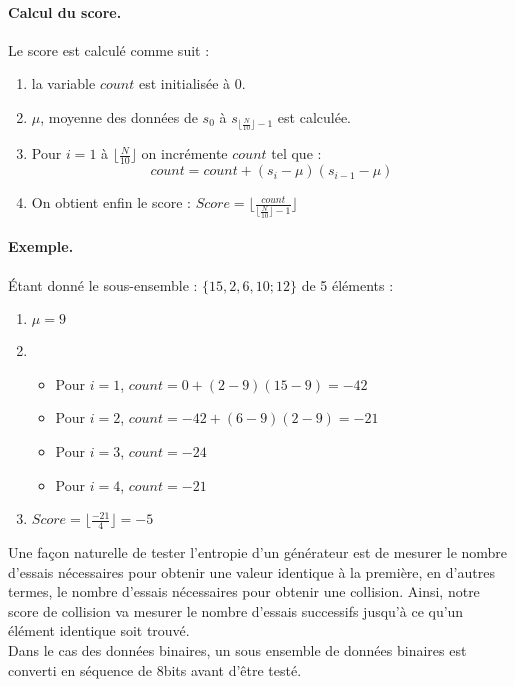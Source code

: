 \paragraph{Calcul du score.\\}
Le score est calculé comme suit : 
\begin{enumerate}
\item la variable $count$ est initialisée à 0.
\item $\mu$, moyenne des données de $s_0$ à $s_{\lfloor\frac{N}{10}\rfloor-1}$ est calculée.
\item Pour $i=1$ à $\lfloor\frac{N}{10}\rfloor$ on incrémente $count$ tel que :
$$count = count + (s_i - \mu)(s_{i-1} - \mu)$$
\item On obtient enfin le score : $Score = \lfloor \frac{count}{\lfloor\frac{N}{10}\rfloor-1} \rfloor$
\end{enumerate}

\paragraph{Exemple.\\}
Étant donné le sous-ensemble : $\lbrace 15, 2 ,6 , 10; 12 \rbrace$ de 5 éléments :
\begin{enumerate}
\item $\mu = 9$
\item 	\begin{itemize}
		\item Pour $i=1$, $count =0 + (2-9)(15-9) = -42$
		\item Pour $i=2$, $count = -42 + (6-9)(2-9) = -21$
		\item Pour $i=3$, $count = -24$
		\item Pour $i=4$, $count = -21$
		\end{itemize}
\item $Score = \lfloor \frac{-21}{4} \rfloor = -5$
\end{enumerate}

Une façon naturelle de tester l'entropie d'un générateur est de mesurer le nombre d'essais nécessaires pour obtenir une valeur identique à la première, en d'autres termes, le nombre d'essais nécessaires pour obtenir une collision. Ainsi, notre score de collision va mesurer le nombre d'essais successifs jusqu'à ce qu'un élément identique soit trouvé.\\


Dans le cas des données binaires, un sous ensemble de données binaires est converti en séquence de 8bits avant d'être testé. \\

